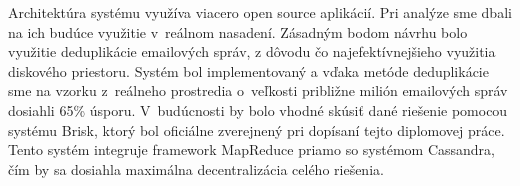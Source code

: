 \documentclass[11pt,twoside,a4paper]{book}
\begin{document}
Architektúra systému využíva viacero open source aplikácií. Pri analýze sme dbali na ich budúce využitie v~reálnom nasadení. Zásadným bodom návrhu bolo využitie deduplikácie emailových správ, z dôvodu čo najefektívnejšieho využitia diskového priestoru. Systém bol implementovaný a vďaka metóde deduplikácie sme na vzorku z~reálneho prostredia o~veľkosti približne milión emailových správ dosiahli 65\% úsporu. V~budúcnosti by bolo vhodné skúsiť dané riešenie pomocou systému Brisk, ktorý bol oficiálne zverejnený pri dopísaní tejto diplomovej práce. Tento systém integruje framework MapReduce priamo so systémom Cassandra, čím by sa dosiahla maximálna decentralizácia celého riešenia.














%
{
\def\CS{$\cal C\kern-0.1667em\lower.5ex\hbox{$\cal S$}\kern-0.075em $}

}

%

\appendix


\end{document}
